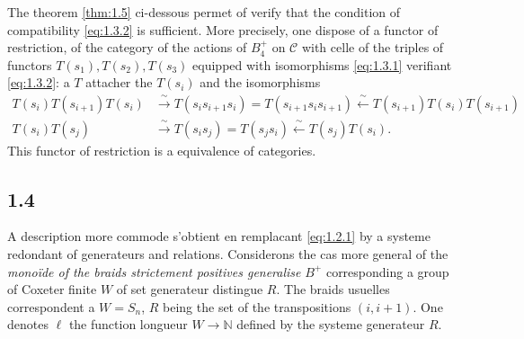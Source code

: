 \documentclass[11pt,a4paper]{article}
\theoremstyle{plain}
\theoremstyle{definition}
\newcommand{\cC}{\mathscr{C}}
\newcommand{\bbN}{\mathbb{N}}
\begin{document}
The theorem \ref{thm:1.5} ci-dessous permet of verify that the condition of compatibility \eqref{eq:1.3.2} is sufficient. More precisely, one dispose of a functor of restriction, of the category of the actions of $B_4^+$ on $\cC$ with celle of the triples of functors $T(s_1), T(s_2), T(s_3)$ equipped with isomorphisms \eqref{eq:1.3.1} verifiant \eqref{eq:1.3.2}: a $T$ attacher the $T(s_i)$ and the isomorphisms
\[
\begin{aligned}
T(s_i) T(s_{i+1}) T(s_i) &\xrightarrow{\;\sim\;} T(s_i s_{i+1} s_i) = T(s_{i+1} s_i s_{i+1}) \xleftarrow{\;\sim\;} T(s_{i+1}) T(s_i) T(s_{i+1}) \\
T(s_i) T(s_j) &\xrightarrow{\;\sim\;} T(s_i s_j) = T(s_j s_i) \xleftarrow{\;\sim\;} T(s_j) T(s_i).
\end{aligned}
\]
This functor of restriction is a equivalence of categories.

\subsection*{1.4}\label{sec:1.4}

A description more commode s'obtient en remplacant \eqref{eq:1.2.1} by a systeme redondant of generateurs and relations. Considerons the cas more general of the \emph{mono\"ide of the braids strictement positives generalise} $B^+$ corresponding a group of Coxeter finite $W$ of set generateur distingue $R$. The braids usuelles correspondent a $W = S_n$, $R$ being the set of the transpositions $(i, i+1)$. One denotes $\ell$ the function longueur $W \to \bbN$ defined by the systeme generateur $R$.
\end{document}
